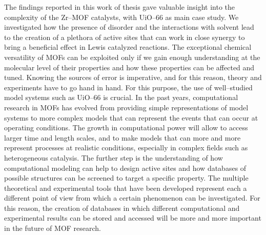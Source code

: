 The findings reported in this work of thesis gave valuable insight into the complexity of the Zr--MOF catalysts, with UiO--66 as main case study. We investigated how the presence of disorder and the interactions with solvent lead to the creation of a plethora of active sites that can work in close synergy to bring a beneficial effect in Lewis catalyzed reactions. The exceptional chemical versatility of MOFs can be exploited only if we gain enough understanding at the molecular level of their properties and how these properties can be affected and tuned. Knowing the sources of error is imperative, and for this reason, theory and experiments have to go hand in hand. For this purpose, the use of well--studied model systems such as UiO--66 is crucial. In the past years, computational research in MOFs has evolved from providing simple representations of model systems to more complex models that can represent the events that can occur at operating conditions. The growth in computational power will allow to access larger time and length scales, and to make models that can more and more represent processes at realistic conditions, especially in complex fields such as heterogeneous catalysis. The further step is the understanding of how computational modeling can help to design active sites and how databases of possible structures can be screened to target a specific property. The multiple theoretical and experimental tools that have been developed represent each a different point of view from which a certain phenomenon can be investigated. For this reason, the creation of databases in which different computational and experimental results can be stored and accessed will be more and more important in the future of MOF research. 
